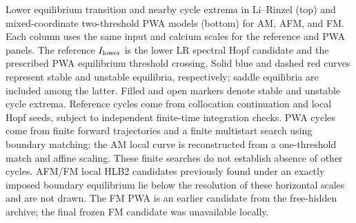 Lower equilibrium transition and nearby cycle extrema in Li--Rinzel (top) and mixed-coordinate two-threshold PWA models (bottom) for AM, AFM, and FM. Each column uses the same input and calcium scales for the reference and PWA panels. The reference $I_{\rm lower}$ is the lower LR spectral Hopf candidate and the prescribed PWA equilibrium threshold crossing. Solid blue and dashed red curves represent stable and unstable equilibria, respectively; saddle equilibria are included among the latter. Filled and open markers denote stable and unstable cycle extrema. Reference cycles come from collocation continuation and local Hopf seeds, subject to independent finite-time integration checks. PWA cycles come from finite forward trajectories and a finite multistart search using boundary matching; the AM local curve is reconstructed from a one-threshold match and affine scaling. These finite searches do not establish absence of other cycles. AFM/FM local HLB2 candidates previously found under an exactly imposed boundary equilibrium lie below the resolution of these horizontal scales and are not drawn. The FM PWA is an earlier candidate from the free-hidden archive; the final frozen FM candidate was unavailable locally.
